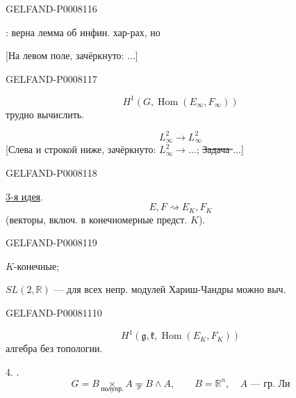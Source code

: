 \begin{GelfandAdjacentEvidence}{GELFAND-P000811}{6}


: верна лемма об инфин. хар-рах, но

[На левом поле, зачёркнуто: \(\ldots\)]
\end{GelfandAdjacentEvidence}
\begin{GelfandAdjacentEvidence}{GELFAND-P000811}{7}

\[
H^1(G,\operatorname{Hom}(E_\infty,F_\infty))
\]
трудно вычислить.

\[
L_\infty^2\longrightarrow L_\infty^2
\]
[Слева и строкой ниже, зачёркнуто: \sout{\(L_\infty^2\longrightarrow\ldots\)};\quad
\sout{Задача \(\ldots\)}]
\end{GelfandAdjacentEvidence}
\begin{GelfandAdjacentEvidence}{GELFAND-P000811}{8}


\uline{3-я идея}.
\[
E,F\rightsquigarrow E_K,F_K
\]
(векторы, включ. в конечномерные предст. \(K\)).

\end{GelfandAdjacentEvidence}
\begin{GelfandAdjacentEvidence}{GELFAND-P000811}{9}


\(K\)-конечные;\qquad {}

\(SL(2,\mathbb R)\) — для всех непр. модулей Хариш-Чандры можно выч.
\end{GelfandAdjacentEvidence}
\begin{GelfandAdjacentEvidence}{GELFAND-P000811}{10}

\[
H^1(\mathfrak g,\mathfrak k,\operatorname{Hom}(E_K,F_K))
\]
алгебра без топологии.

4. .
\[
G=B\underset{\text{полупр.}}{\times}A\underset{\sigma}{=}B\wedge A,
\qquad B=\mathbb R^n,\quad A\text{ — гр. Ли}
\]
\end{GelfandAdjacentEvidence}


